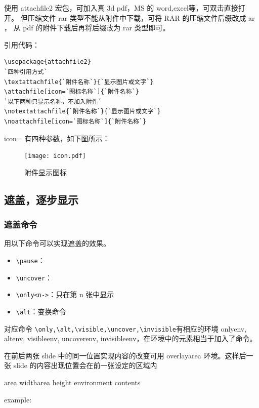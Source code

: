 
使用 attachfile2 宏包，可加入真 3d pdf，MS 的 word,excel等，可双击直接打开。
但压缩文件 rar 类型不能从附件中下载，可将 RAR 的压缩文件后缀改成 ar ，
从 pdf 的附件下载后再将后缀改为 rar 类型即可。

引用代码：
\begin{lstlisting}[language={[LaTeX]TeX}]
\usepackage{attachfile2}
`四种引用方式`
\textattachfile{`附件名称`}{`显示图片或文字`}
\attachfile[icon=`图标名称`]{`附件名称`}
`以下两种只显示名称，不加入附件`
\notextattachfile{`附件名称`}{`显示图片或文字`}
\noattachfile[icon=`图标名称`]{`附件名称`}
\end{lstlisting}

icon= 有四种参数，如下图所示：

\begin{figure}[htbp]%
\centering
\texttt{[image: icon.pdf]}
\caption{附件显示图标} \label{icon}
\end{figure}


\subsection{遮盖，逐步显示}

\subsubsection{遮盖命令}
用以下命令可以实现遮盖的效果。
\begin{itemize}
  \item \verb|\pause|：
  \item \verb|\uncover|：
  \item \verb|\only<n->|：只在第 n 张中显示
  \item \verb|\alt|：变换命令
\end{itemize}
对应命令 \verb|\only,\alt,\visible,\uncover,\invisible|有相应的环境 onlyenv, altenv, visibleenv, uncoverenv, invisibleenv，在环境中的元素相当于加入了命令。

在前后两张 slide 中的同一位置实现内容的改变可用 overlayarea 环境。这样后一张 slide 的内容出现位置会在前一张设定的区域内
\begin{cmd}
\begin{overlayarea}{area width}{area height}
environment contents
\end{overlayarea}
 example:
\begin{frame}
\begin{overlayarea}{\textwidth}{3cm}
\end{overlayarea}
\end{frame}
\end{cmd}


